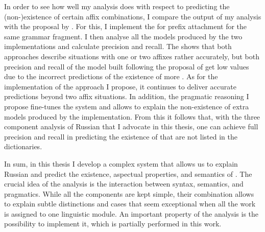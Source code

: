 In order to see how well my analysis does with respect to predicting the \mbox{(non-)}\linebreak[3]existence of certain affix combinations, I compare the output of my analysis with the proposal by \citet{Tatevosov:09}. For this, I implement the  for prefix attachment for the same grammar fragment. I then analyse all the models produced by the two implementations and calculate precision and recall. The  shows that both approaches describe situations with one or two affixes rather accurately, but both precision and recall of the model built following the proposal of \citet{Tatevosov:09} get low values due to the incorrect predictions of the existence of more . As for the implementation of the approach I propose, it continues to deliver accurate predictions beyond two affix situations. In addition, the pragmatic reasoning I propose fine-tunes the system and allows to explain the non-existence of extra models produced by the implementation. From this it follows that, with the three component analysis of Russian  that I advocate in this thesis, one can achieve full precision and recall in predicting the existence of  that are not listed in the dictionaries.\largerpage

In sum, in this thesis I develop a complex system that allows us to explain Russian  and predict the existence, aspectual properties, and semantics of . The crucial idea of the analysis is the interaction between syntax, semantics, and pragmatics. While all the components are kept simple, their combination allows to explain subtle distinctions and cases that seem exceptional when all the work is assigned to one linguistic module. An important property of the analysis is the possibility to implement it, which is partially performed in this work.
